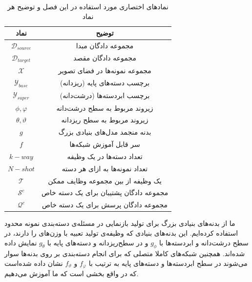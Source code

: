   \begin{table}[!htbp]
  	\caption{نماد‌های اختصاری مورد استفاده در این فصل و توضیح هر نماد}
  	\label{table:symbols}
  	\centering
\begin{tabular}{@{}cc@{}}
	\toprule
	نماد                   & توضیح                                  \\ \midrule
	$\mathcal{D}_{source}$ & مجموعه دادگان مبدا                     \\
	$\mathcal{D}_{target}$ & مجموعه دادگان مقصد                     \\
	$\mathcal{X}$          & مجموعه نمونه‌ها در فضای تصویر          \\
	$\mathcal{Y}_{base}$   & برچسب دسته‌های پایه (ریزدانه)          \\
	$\mathcal{Y}_{super}$  & برچسب ابردسته‌ها (درشت‌دانه)           \\
	$\phi, \varphi$        & زیروند مربوط به سطح درشت‌دانه          \\
	$\theta, \vartheta$    & زیروند مربوط به سطح ریزدانه            \\
	$g$                    & بدنه منجمد مدل‌های بنیادی بزرگ         \\
	$f$                    & سر قابل آموزش شبکه‌ها                  \\
	$k-way$                & تعداد دسته‌ها در یک وظیفه              \\
	$N-shot$               & تعداد نمونه‌ها به ازای هر دسته         \\
	$\mathcal{T}$          & یک وظیفه از بین مجموعه وظایف ممکن      \\
	$\mathcal{S}^c$        & مجموعه دادگان پشتیبان برای یک دسته خاص \\
	$\mathcal{Q}^c$        & مجموعه دادگان پرسش برای یک دسته خاص    \\ \bottomrule
\end{tabular}%
  \end{table}

  
  ما از بدنه‌های بنیادی بزرگ برای تولید بازنمایی در مسئله‌ی دسته‌بندی نمونه محدود استفاده کرده‌ایم. این بدنه‌های بنیادی که وظیفه‌ی تولید تعبیه با وزن‌های 
  را دارند، در سطح درشت‌دانه و ابردسته‌ها با 
  $g_\phi$
  و در سطح‌ریزدانه و دسته‌های پایه با 
  $g_\theta$
  نمایش داده شده‌اند. همچنین شبکه‌های کاملا متصلی که برای انجام دسته‌بندی بر روی بدنه‌ها سوار می‌شوند در سطح ابردسته‌ها و دسته‌های پایه به ترتیب با 
  $f_\varphi$
  و 
  $f_\vartheta$
  نشان داده‌ شده‌است که در واقع بخشی است که ما آموزش می‌دهیم. 
  
